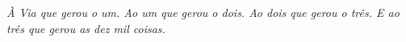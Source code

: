 \begin{dedicatoria}
   \vspace*{\fill}
   \vspace*{\fill}
   \vspace*{\fill}
   \vspace*{\fill}
   \vspace*{\fill}
   \vspace*{\fill}
   \vspace*{\fill}
   \vspace*{\fill}
   \vspace*{\fill}
   \vspace*{\fill}
   \vspace*{\fill}
   \vspace*{\fill}
   \vspace*{\fill}
   \vspace*{\fill}
   \vspace*{\fill}
   \vspace*{\fill}
   \vspace*{\fill}
   \vspace*{\fill}
   \vspace*{\fill}
   \vspace*{\fill}
   \vspace*{\fill}
   \vspace*{\fill}
   \vspace*{\fill}
   \vspace*{\fill}
   \vspace*{\fill}
   \vspace*{\fill}
   \vspace*{\fill}
   \vspace*{\fill}
   \vspace*{\fill}
   \vspace*{\fill}
   \vspace*{\fill}
   \vspace*{\fill}
   \centering
   \noindent
   \textit{À Via que gerou o um. Ao um que gerou o dois. Ao dois que gerou o três. E ao tr\^es que gerou as dez mil coisas.} \vspace*{\fill}
\end{dedicatoria}